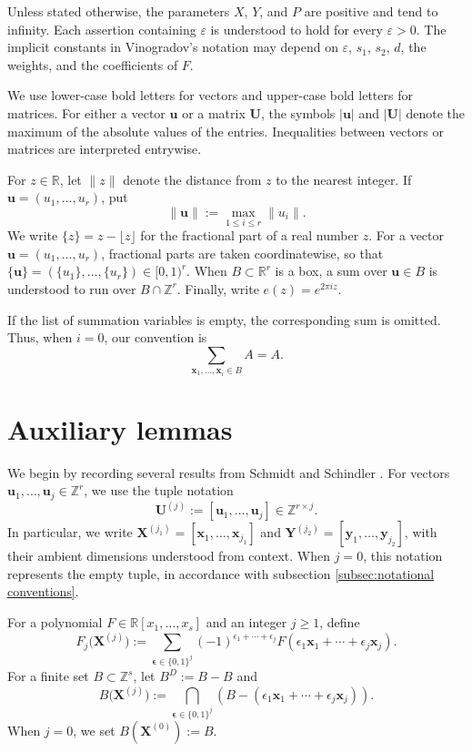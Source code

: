 \documentclass[12pt,reqno]{amsart}
\theoremstyle{definition}
\theoremstyle{remark}
\numberwithin{equation}{section}
\def\bfu{{\mathbf u}}
\def\bfx{{\mathbf x}}
\def\bfy{{\mathbf y}}
\def\bfX{{\mathbf X}}
\def\bfY{{\mathbf Y}}
\def\R{{\mathbb R}}\def\T{{\mathbb T}}
\def\Z{{\mathbb Z}}\def\Q{{\mathbb Q}}
\def\eps{\varepsilon}
\begin{document}
Unless stated otherwise, the parameters $X$, $Y$, and $P$ are positive and
tend to infinity.  Each assertion containing $\eps$ is understood to hold
for every $\eps>0$.  The implicit constants in Vinogradov's notation may
depend on $\eps$, $s_1$, $s_2$, $d$, the weights, and the coefficients of
$F$.

We use lower-case bold letters for vectors and upper-case bold letters for
matrices.  For either a vector $\bfu$ or a matrix $\mathbf U$, the symbols
$|\bfu|$ and $|\mathbf U|$ denote the maximum of the absolute values of the
entries.  Inequalities between vectors or matrices are interpreted
entrywise.

For $z\in\R$, let $\|z\|$ denote the distance from $z$ to the nearest
integer.  If $\bfu=(u_1,\ldots,u_r)$, put
\[
    \|\bfu\|:=\max_{1\leq i\leq r}\|u_i\|.
\]
We write $\{z\}=z-\lfloor z\rfloor$ for the fractional part of a real
number $z$.  For a vector $\bfu=(u_1,\ldots,u_r)$, fractional parts are
taken coordinatewise, so that
$\{\bfu\}=(\{u_1\},\ldots,\{u_r\})\in[0,1)^r$.
When $B\subset\R^r$ is a box, a sum over $\bfu\in B$ is understood to run
over $B\cap\Z^r$.  Finally, write $e(z)=e^{2\pi iz}$.

If the list of summation variables is empty, the corresponding sum is
omitted. Thus, when $i=0$, our convention is
\[
    \sum_{\bfx_1,\ldots,\bfx_i\in B} A=A.
\]


\section{Auxiliary lemmas}\label{sec:auxiliary lemmas}
We begin by recording several results
from Schmidt \cite{Schmidt1985} and Schindler \cite{Schindler2014}.
For vectors $\bfu_1,\ldots,\bfu_j\in\Z^r$, we use the tuple notation
\begin{equation}\label{eq:tuple notation}
    \mathbf U^{(j)}:=[\bfu_1,\ldots,\bfu_j]\in\Z^{r\times j}.
\end{equation}
In particular, we write
$\bfX^{(j_1)}=[\bfx_1,\ldots,\bfx_{j_1}]$ and
$\bfY^{(j_2)}=[\bfy_1,\ldots,\bfy_{j_2}]$, with their ambient dimensions
understood from context. When $j=0$, this notation represents the empty
tuple, in accordance with subsection \ref{subsec:notational conventions}.

For a
polynomial $F\in\R[x_1,\ldots,x_s]$ and an integer $j\geq1$, define
\[
F_j\bigl(\bfX^{(j)}\bigr)
:=\sum_{\boldsymbol\epsilon\in\{0,1\}^j}
(-1)^{\epsilon_1+\cdots+\epsilon_j}
F(\epsilon_1\bfx_1+\cdots+\epsilon_j\bfx_j).
\]
For a finite set $B\subset\Z^s$, let $B^D:=B-B$ and
\[
B\bigl(\bfX^{(j)}\bigr)
:=\bigcap_{\boldsymbol\epsilon\in\{0,1\}^j}
\left(B-(\epsilon_1\bfx_1+\cdots+\epsilon_j\bfx_j)\right).
\]
When $j=0$, we set $B(\bfX^{(0)}):=B$.
\end{document}
